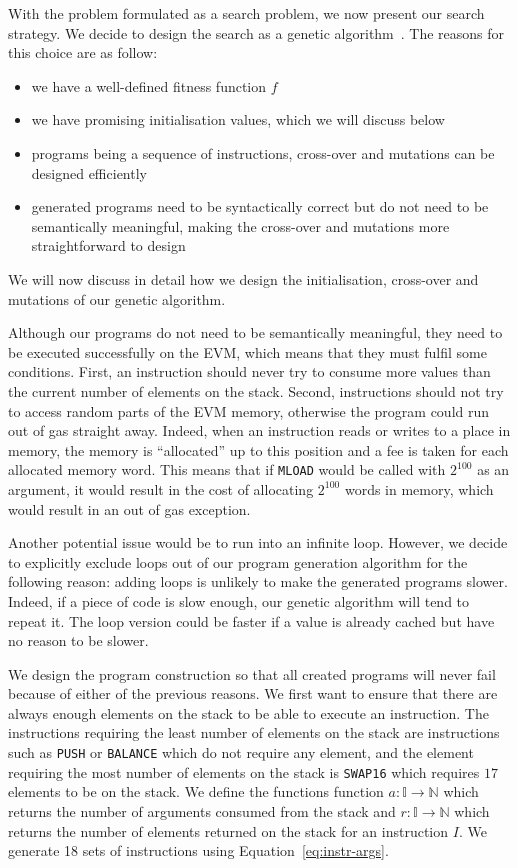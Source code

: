 With the problem formulated as a search problem, we now present our search strategy. We decide to design the search as a genetic algorithm~\cite{whitley1994genetic}. The reasons for this choice are as follow:

\begin{itemize}
\item we have a well-defined fitness function $f$
\item we have promising initialisation values, which we will discuss below
\item programs being a sequence of instructions, cross-over and mutations can be designed efficiently
\item generated programs need to be syntactically correct but do not need to be semantically meaningful, making the cross-over and mutations more straightforward to design
\end{itemize}
%
We will now discuss in detail how we design the initialisation, cross-over and mutations of our genetic algorithm.

Although our programs do not need to be semantically meaningful, they need to be executed successfully on the EVM, which means that they must fulfil some conditions. First, an instruction should never try to consume more values than the current number of elements on the stack. Second, instructions should not try to access random parts of the EVM memory, otherwise the program could run out of gas straight away. Indeed, when an instruction reads or writes to a place in memory, the memory is ``allocated'' up to this position and a fee is taken for each allocated memory word. This means that if \lstinline{MLOAD} would be called with $2^{100}$ as an argument, it would result in the cost of allocating $2^{100}$ words in memory, which would result in an out of gas exception.

Another potential issue would be to run into an infinite loop. However, we decide to explicitly exclude loops out of our program generation algorithm for the following reason: adding loops is unlikely to make the generated programs slower. Indeed, if a piece of code is slow enough, our genetic algorithm will tend to repeat it. The loop version could be faster if a value is already cached but have no reason to be slower.

We design the program construction so that all created programs will never fail because of either of the previous reasons. We first want to ensure that there are always enough elements on the stack to be able to execute an instruction. The instructions requiring the least number of elements on the stack are instructions such as \lstinline{PUSH} or \lstinline{BALANCE} which do not require any element, and the element requiring the most number of elements on the stack is \lstinline{SWAP16} which requires $17$ elements to be on the stack. We define the functions function $a : \mathbb{I} \rightarrow \mathbb{N}$ which returns the number of arguments consumed from the stack and $r : \mathbb{I} \rightarrow \mathbb{N}$ which returns the number of elements returned on the stack for an instruction $I$. We generate 18 sets of instructions using Equation~\ref{eq:instr-args}.

